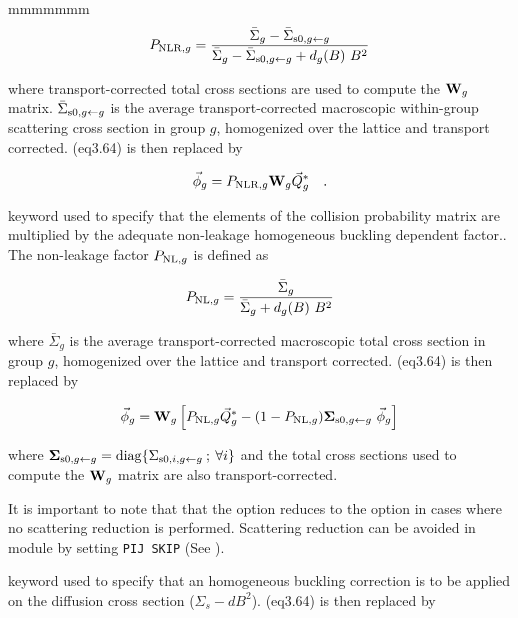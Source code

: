 \begin{ListeDeDescription}{mmmmmmm}
\begin{equation}
P_{{\rm NLR},g}={\bar\Sigma_g-\bar\Sigma_{{\rm s0},g \gets g}\over{\bar\Sigma_g-\bar\Sigma_{{\rm s0},g \gets g}+d_g(B) \ B^2}}
\end{equation}

\noindent where transport-corrected total
cross sections are used to compute the ${\bf W}_g$ matrix. $\bar\Sigma_{{\rm s0},g \gets g}$ is the average
transport-corrected macroscopic within-group scattering cross section in group $g$,
homogenized over the lattice and transport corrected. \eq(eq3.64) is then replaced by
 
\begin{equation}
\vec\phi_g=P_{{\rm NLR},g} {\bf W}_g \vec Q^*_g \ \ \ .
\label{eq:eq5.36}
\end{equation}

\item[\moc{PNL}] keyword used to specify that the elements of the collision
probability matrix are multiplied by the adequate non-leakage homogeneous buckling
dependent factor.\cite{ALSB1}. The non-leakage factor $P_{{\rm NL},g}$ is defined as

\begin{equation}
P_{{\rm NL},g}={\bar\Sigma_g\over{\bar\Sigma_g+d_g(B) \ B^2}}
\end{equation}

\noindent where $\bar\Sigma_g$ is the average transport-corrected macroscopic total cross section
in group $g$, homogenized over the lattice and transport corrected. \eq(eq3.64) is then replaced by

\begin{equation}
\vec\phi_g={\bf W}_g \left[ P_{{\rm NL},g} \vec Q^*_g -(1-P_{{\rm NL},g}) {\bf \Sigma}_{{\rm s0},g\gets g} \ \vec\phi_g \right]
\label{eq:eq5.33b}
\end{equation}

\noindent where ${\bf \Sigma}_{{\rm s0},g\gets g}={\rm diag} \{ \Sigma_{{\rm s0},i,g \gets g}\> ;\> \forall i \}$
and the total cross sections used to compute the ${\bf W}_g$ matrix are also
transport-corrected.

\vskip 0.02cm

\noindent It is important to note that that the  option reduces to the  option in
cases where no scattering reduction is performed. Scattering reduction can be avoided in module
 by setting {\tt PIJ SKIP} (See ).

\item[\moc{SIGS}] keyword used to specify that an homogeneous buckling
correction is to be applied on the diffusion cross section ($\Sigma_{s} -
dB^{2}$). \eq(eq3.64) is then replaced by


\end{ListeDeDescription}
